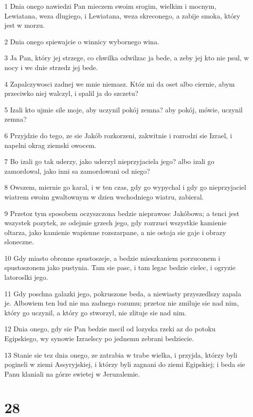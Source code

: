 \par 1 Dnia onego nawiedzi Pan mieczem swoim srogim, wielkim i mocnym, Lewiatana, weza dlugiego, i Lewiatana, weza skreconego, a zabije smoka, który jest w morzu.
\par 2 Dnia onego spiewajcie o winnicy wybornego wina.
\par 3 Ja Pan, który jej strzege, co chwilka odwilzac ja bede, a zeby jej kto nie psul, w nocy i we dnie strzedz jej bede.
\par 4 Zapalczywosci zadnej we mnie niemasz. Któz mi da oset albo ciernie, abym przeciwko niej walczyl, i spalil ja do szczetu?
\par 5 Izali kto ujmie sile moje, aby uczynil pokój zemna? aby pokój, mówie, uczynil zemna?
\par 6 Przyjdzie do tego, ze sie Jakób rozkorzeni, zakwitnie i rozrodzi sie Izrael, i napelni okrag ziemski owocem.
\par 7 Bo izali go tak uderzy, jako uderzyl nieprzyjaciela jego? albo izali go zamordowal, jako inni sa zamordowani od niego?
\par 8 Owszem, miernie go karal, i w ten czas, gdy go wypychal i gdy go nieprzyjaciel wiatrem swoim gwaltownym w dzien wschodniego wiatru, zabieral.
\par 9 Przetoz tym sposobem oczyszczona bedzie nieprawosc Jakóbowa; a tenci jest wszystek pozytek, ze odejmie grzech jego, gdy rozrzuci wszystkie kamienie oltarza, jako kamienie wapienne rozszarpane, a nie ostoja sie gaje i obrazy sloneczne.
\par 10 Gdy miasto obronne spustoszeje, a bedzie mieszkaniem porzuconem i spustoszonem jako pustynia. Tam sie pasc, i tam legac bedzie cielec, i ogryzie latoroslki jego.
\par 11 Gdy poschna galazki jego, pokruszone beda, a niewiasty przyszedlszy zapala je. Albowiem ten lud nie ma zadnego rozumu; przetoz nie zmiluje sie nad nim, który go uczynil, a który go stworzyl, nie zlituje sie nad nim.
\par 12 Dnia onego, gdy sie Pan bedzie mscil od lozyska rzeki az do potoku Egipskiego, wy synowie Izraelscy po jednemu zebrani bedziecie.
\par 13 Stanie sie tez dnia onego, ze zatrabia w trabe wielka, i przyjda, którzy byli pogineli w ziemi Assyryjskiej, i którzy byli zagnani do ziemi Egipskiej; i beda sie Panu klaniali na górze swietej w Jeruzalemie.

\chapter{28}

